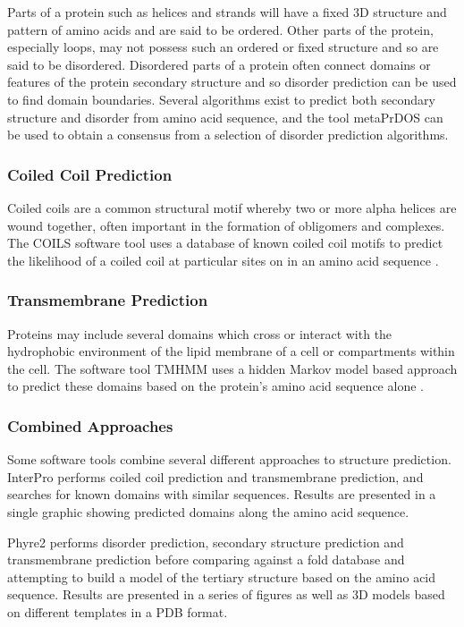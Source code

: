 \documentclass[fleqn,10pt]{article} %
\begin{document}
Parts of a protein such as helices and strands will have a fixed 3D structure and pattern of amino acids and are said to be ordered. Other parts of the protein, especially loops, may not possess such an ordered or fixed structure and so are said to be disordered. Disordered parts of a protein often connect domains or features of the protein secondary structure and so disorder prediction can be used to find domain boundaries. Several algorithms exist to predict both secondary structure and disorder from amino acid sequence, and the tool metaPrDOS \cite{Ishida2008} can be used to obtain a consensus from a selection of disorder prediction algorithms.

\subsubsection*{Coiled Coil Prediction}

Coiled coils are a common structural motif whereby two or more alpha helices are wound together, often important in the formation of obligomers and complexes. The COILS software tool uses a database of known coiled coil motifs to predict the likelihood of a coiled coil at particular sites on in an amino acid sequence \cite{Lupas1991}.

\subsubsection*{Transmembrane Prediction}

Proteins may include several domains which cross or interact with the hydrophobic environment of the lipid membrane of a cell or compartments within the cell. The software tool TMHMM uses a hidden Markov model based approach to predict these domains based on the protein's amino acid sequence alone \cite{Krogh2001}.

\subsubsection*{Combined Approaches}

Some software tools combine several different approaches to structure prediction. InterPro \cite{Mulder2002} performs coiled coil prediction and transmembrane prediction, and searches for known domains with similar sequences. Results are presented in a single graphic showing predicted domains along the amino acid sequence.

Phyre2 \cite{Kelley2009} performs disorder prediction, secondary structure prediction and transmembrane prediction before comparing against a fold database and attempting to build a model of the tertiary structure based on the amino acid sequence. Results are presented in a series of figures as well as 3D models based on different templates in a PDB format.
\end{document}
